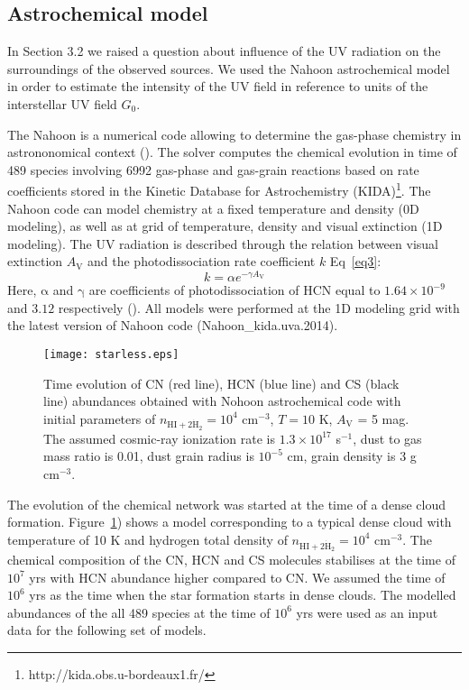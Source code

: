 \documentclass{aa}
\begin{document}
\subsection{Astrochemical model}

In Section 3.2 we raised a question about influence of the UV radiation on the surroundings of the observed sources. We used the Nahoon astrochemical model in order to estimate the intensity of the UV field in reference to units of the interstellar UV field $G_0$.

The Nahoon is a numerical code allowing to determine the gas-phase chemistry in astrononomical context  (\citealt{Wak12}). The solver computes the chemical evolution in time of 489 species involving 6992 gas-phase and gas-grain reactions based on rate coefficients stored in the Kinetic Database for Astrochemistry (KIDA)\footnote{http://kida.obs.u-bordeaux1.fr/}. The Nahoon code can model chemistry at a fixed temperature and density (0D modeling), as well as at grid of temperature, density and visual extinction (1D modeling). The UV radiation is described through the relation between visual extinction $A_\mathrm{V}$ and the photodissociation rate coefficient $k$ Eq~\ref{eq3}:
\begin{equation} \label{eq3}
k = \alpha e^{-\gamma A_\mathrm{V}}
\end{equation}
Here, $\mathrm{\alpha}$ and $\mathrm{\gamma}$ are coefficients of photodissociation of HCN equal to $1.64\times10^{-9}$ and $3.12$ respectively (\cite{Hea17}). 
All models were performed at the 1D modeling grid with the latest version of Nahoon code (Nahoon\_kida.uva.2014).


\begin{figure}
\centering
\texttt{[image: starless.eps]}
\caption{Time evolution of CN (red line), HCN (blue line) and CS (black line) abundances obtained with Nohoon astrochemical code with initial parameters of $n_\mathrm{HI+2 \dot H_2} = 10^4$ cm$^{-3}$, $T = 10$ K, $A_\mathrm{V}$ = 5 mag. The assumed cosmic-ray ionization rate is $1.3\times10^{17}$ s$^{-1}$, dust to gas mass ratio is 0.01, dust grain radius is $10^{-5}$ cm, grain density is 3 g cm$^{-3}$.}
\label{starless}
\end{figure}

The evolution of the chemical network was started at the time of a dense cloud formation. Figure~\ref{starless}) shows a model corresponding to a typical dense cloud with temperature of 10 K and hydrogen total density of $n_\mathrm{HI+2 \dot H_2} = 10^4$ cm$^{-3}$. The chemical composition of the CN, HCN and CS molecules stabilises at the time of $10^{7}$ yrs with HCN abundance higher compared to CN. We assumed the time of $10^{6}$ yrs as the time when the star formation starts in dense clouds. The modelled abundances of the all 489 species at the time of $10^{6}$ yrs were used as an input data for the following set of models.
\end{document}
